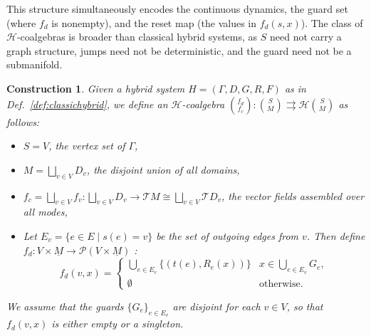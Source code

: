 \documentclass[letterpaper, 10 pt, conference]{IEEEconf}
\newtheorem{construction}[thm]{Construction}
\theoremstyle{definition}
\newcommand{\maps}{\colon}
\newcommand{\chart}{\rightrightarrows}
\newcommand{\functor}[1]{\mathcal{#1}}
\renewcommand{\H}{\functor{H}}
\renewcommand{\P}{\functor{P}}
\newcommand{\T}{\functor{T}}
\begin{document}
This structure simultaneously encodes the continuous dynamics, the guard set (where $f_d$ is nonempty), and the reset map (the values in $f_d(s,x)$). The class of $\H$-coalgebras is broader than classical hybrid systems, as $S$ need not carry a graph structure, jumps need not be deterministic, and the guard need not be a submanifold.

\begin{construction}
\label{con:hybridcoalgebra}
    Given a hybrid system $H = (\Gamma, D, G, R, F)$ as in Def.~\ref{def:classichybrid}, we define an $\H$-coalgebra $\binom{f_d}{f_c} \maps \binom SM \chart \H\binom SM$ as follows:
    \begin{itemize}
        \item $S = V$, the vertex set of $\Gamma$,
        \item $M = \bigsqcup_{v \in V} D_v$, the disjoint union of all domains,
        \item $f_c = \bigsqcup_{v \in V} f_v \maps \bigsqcup_{v \in V} D_v \to \T M \cong \bigsqcup_{v \in V} \T D_v$, the vector fields assembled over all modes,
        \item Let $E_v = \{e \in E \mid s(e) = v\}$ be the set of outgoing edges from $v$. Then define $f_d \maps V \times \underline{M} \to \P(V \times \underline{M})$ :
        \[
            f_d(v, x) = \begin{cases} \bigcup_{e \in E_v} \{(t(e), R_e(x))\} & x \in \bigcup_{e \in E_v} G_e, \\ \emptyset & \text{otherwise.} \end{cases}
        \]
    \end{itemize}
    We assume that the guards $\{G_e\}_{e \in E_v}$ are disjoint for each  $v \in V$, so that $f_d(v,x)$ is either empty or a singleton.
\end{construction}
\end{document}
